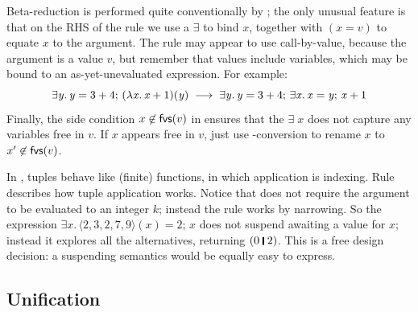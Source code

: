 \documentclass[acmsmall,review,anonymous,dvipsnames]{acmart}
\newcommand{\Varid}[1]{\mathit{#1}}
\begin{document}
Beta-reduction is performed quite conventionally by ; the
only unusual feature is that on the RHS of the rule we use a \ensuremath{\exists} to bind \ensuremath{\Varid{x}},
together with \ensuremath{(\Varid{x}\mathrel{=}\Varid{v})} to equate \ensuremath{\Varid{x}} to the argument.
The rule may appear to use call-by-value, because the argument is a value \ensuremath{\Varid{v}},
but remember that values include variables, which may be bound to an
as-yet-unevaluated expression.  For example:
$$
\ensuremath{\exists\Varid{y}.\,\Varid{y}\mathrel{=}\mathrm{3}\mathbin{+}\mathrm{4};\,(\lambda\Varid{x}.\,\Varid{x}\mathbin{+}\mathrm{1})(\Varid{y})}
\; \movesto \;
\ensuremath{\exists\Varid{y}.\,\Varid{y}\mathrel{=}\mathrm{3}\mathbin{+}\mathrm{4};\,\exists\Varid{x}.\,\Varid{x}\mathrel{=}\Varid{y};\,\Varid{x}\mathbin{+}\mathrm{1}}
$$
Finally, the side condition $x \not\in \mathsf{fvs}(v)$ in 
ensures that the \ensuremath{\exists\;\Varid{x}}
does not capture any variables free in \ensuremath{\Varid{v}}.  If \ensuremath{\Varid{x}} appears free in \ensuremath{\Varid{v}}, just use
\textalpha-conversion to rename \ensuremath{\Varid{x}} to $x' \not\in \mathsf{fvs}(v)$.

In \versecalc{}, tuples behave like (finite) functions, in which application is
indexing.  Rule  describes how tuple application works.
Notice that  does not require the argument to be evaluated to an integer $k$; instead
the rule works by narrowing.  So the expression \ensuremath{\exists\Varid{x}.\,\langle{}\mathrm{2},\mathrm{3},\mathrm{2},\mathrm{7},\mathrm{9}\rangle(\Varid{x})\mathrel{=}\mathrm{2};\,\Varid{x}}
does not suspend awaiting a value for \ensuremath{\Varid{x}}; instead it explores all the
alternatives, returning \ensuremath{(\mathrm{0}\;\rule[-0.3mm]{0.5mm}{2.5mm}\;\mathrm{2})}.  This is a free design decision:
a suspending semantics would be equally easy to express.

\subsection{Unification} \label{sec:unification-rules}
\end{document}
